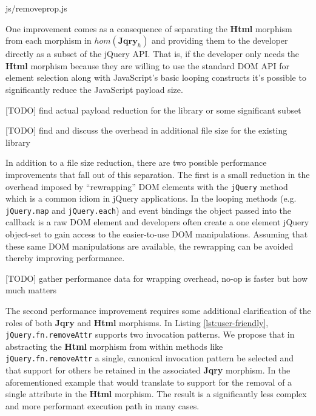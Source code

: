 \documentclass[preprint, leqno]{sigplanconf}
\begin{document}
\begin{top}
\begin{lstinputlisting}[
    language=JavaScript,
    caption={Satisfying the Functor Laws},
    label={lst:removeprop},
    escapeinside={@}{@}
]{js/removeprop.js}
\vspace{-15pt}
\end{lstinputlisting}
\end{top}

One improvement comes as a consequence of separating the \textbf{Html} morphism from each morphism in \begin{math}hom(\mathbf{Jqry}_{h})\end{math} and providing them to the developer directly as a subset of the jQuery API. That is, if the developer only needs the \textbf{Html} morphism because they are willing to use the standard DOM API for element selection along with JavaScript's basic looping constructs it's possible to significantly reduce the JavaScript payload size.

[TODO] find actual payload reduction for the library or some significant subset

[TODO] find and discuss the overhead in additional file size for the existing library

In addition to a file size reduction, there are two possible performance improvements that fall out of this separation. The first is a small reduction in the overhead imposed by ``rewrapping'' DOM elements with the \verb|jQuery| method which is a common idiom in jQuery applications. In the looping methods (e.g. \verb|jQuery.map| and \verb|jQuery.each|) and event bindings the object passed into the callback is a raw DOM element and developers often create a one element jQuery object-set to gain access to the easier-to-use DOM manipulations. Assuming that these same DOM manipulations are available, the rewrapping can be avoided thereby improving performance.

[TODO] gather performance data for wrapping overhead, no-op is faster but how much matters

The second performance improvement requires some additional clarification of the roles of both \textbf{Jqry} and \textbf{Html} morphisms. In Listing \ref{lst:user-friendly}, \verb|jQuery.fn.removeAttr| supports two invocation patterns. We propose that in abstracting the \textbf{Html} morphism from within methods like \verb|jQuery.fn.removeAttr| a single, canonical invocation pattern be selected and that support for others be retained in the associated \textbf{Jqry} morphism. In the aforementioned example that would translate to support for the removal of a single attribute in the \textbf{Html} morphism. The result is a significantly less complex and more performant execution path in many cases.
\end{document}
